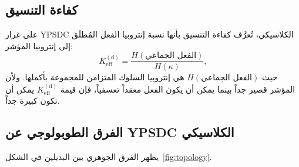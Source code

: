 \documentclass[11pt,a4paper]{article}
\newcommand{\Keff}{K_{\mathrm{eff}}}
\begin{document}
	\subsection{كفاءة التنسيق}
	
	على غرار YPSDC الكلاسيكي، تُعرَّف كفاءة التنسيق بأنها نسبة إنتروبيا الفعل المُطلَق إلى إنتروبيا المؤشر:
	\begin{equation}
		\Keff^{\mathrm{(d)}} = \frac{H(\text{الفعل الجماعي})}{H(\kappa)},
		\label{eq:Keff_d}
	\end{equation}
	حيث \(H(\text{الفعل الجماعي})\) هي إنتروبيا السلوك المتزامن للمجموعة بأكملها. ولأن المؤشر قصير جداً بينما يمكن أن يكون الفعل معقداً تعسفياً، فإن قيمة \(\Keff^{\mathrm{(d)}}\) يمكن أن تكون كبيرة جداً.
	
	\subsection{الفرق الطوبولوجي عن YPSDC الكلاسيكي}
	
	يظهر الفرق الجوهري بين البديلين في الشكل~\ref{fig:topology}.
	
\end{document}
